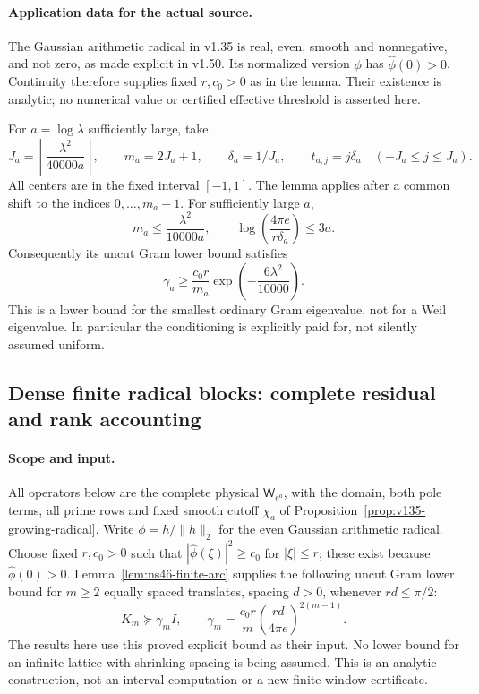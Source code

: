 \paragraph{Application data for the actual source.}
The Gaussian arithmetic radical in v1.35 is real, even, smooth and
nonnegative, and not zero, as made explicit in v1.50. Its normalized
version $\phi$ has $\widehat\phi(0)>0$. Continuity therefore supplies
fixed $r,c_0>0$ as in the lemma. Their existence is analytic; no numerical
value or certified effective threshold is asserted here.

For $a=\log\lambda$ sufficiently large, take
\[
 J_a=\left\lfloor\frac{\lambda^2}{40000a}\right\rfloor,
 \qquad m_a=2J_a+1,\qquad \delta_a=1/J_a,
 \qquad t_{a,j}=j\delta_a\quad(-J_a\le j\le J_a).
\]
All centers are in the fixed interval $[-1,1]$.
The lemma applies after a common shift to the indices $0,\ldots,m_a-1$.
For sufficiently large $a$,
\[
 m_a\le\frac{\lambda^2}{10000a},\qquad
 \log\left(\frac{4\pi e}{r\delta_a}\right)\le3a.
\]
Consequently its uncut Gram lower bound satisfies
\begin{equation}\label{eq:ns46-gram-asymptotic}
 \gamma_a\ge\frac{c_0r}{m_a}
       \exp\left(-\frac{6\lambda^2}{10000}\right).
\end{equation}
This is a lower bound for the smallest ordinary Gram eigenvalue,
not for a Weil eigenvalue. In particular the conditioning is explicitly
paid for, not silently assumed uniform.


\subsection*{Dense finite radical blocks: complete residual and rank accounting}
\label{ns46-a2-sec-block}

\paragraph{Scope and input.}
All operators below are the complete physical $\mathsf W_{e^a}$,
with the domain, both pole terms, all prime rows and fixed smooth
cutoff $\chi_a$ of Proposition~\ref{prop:v135-growing-radical}.
Write $\phi=h/\|h\|_2$ for the even Gaussian arithmetic radical.
Choose fixed $r,c_0>0$ such that $|\widehat\phi(\xi)|^2\ge c_0$
for $|\xi|\le r$; these exist because $\widehat\phi(0)>0$.
Lemma~\ref{lem:ns46-finite-arc} supplies the following
uncut Gram lower bound for $m\ge2$ equally spaced translates,
spacing $d>0$, whenever $rd\le\pi/2$:
\begin{equation}\label{ns46-a2-eq-arc-input}
 K_m\succeq\gamma_m I,\qquad
 \gamma_m=\frac{c_0r}{m}
       \left(\frac{rd}{4\pi e}\right)^{2(m-1)}.
\end{equation}
The results here use this proved explicit bound as their input.
No lower bound for an infinite lattice with shrinking spacing is
being assumed. This is an analytic construction, not an interval
computation or a new finite-window certificate.

